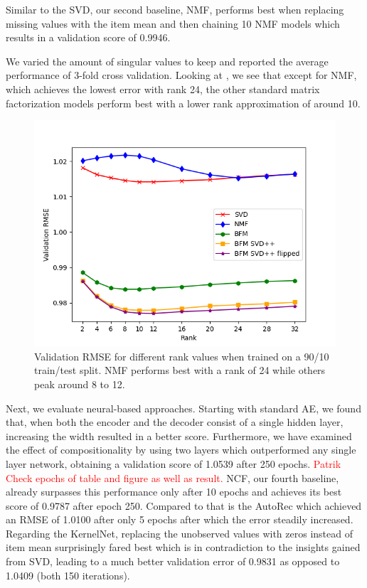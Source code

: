 \documentclass[10pt,conference,compsocconf]{IEEEtran}
\newcommand{\todo}[1]{\textcolor{red}{#1}}
\begin{document}


    Similar to the SVD, our second baseline, NMF, performs best when replacing missing values with the item mean and then chaining 10 NMF models which results in a validation score of 0.9946.

    We varied the amount of singular values to keep and reported the average performance of 3-fold cross validation.
    Looking at , we see that except for NMF, which achieves the lowest error with rank 24, the other standard matrix factorization models perform best with a lower rank approximation of around 10.
    \begin{figure}
        \includegraphics[width=\columnwidth]{figures/rank.png}
        \caption{Validation RMSE for different rank values when trained on a 90/10 train/test split.
        NMF performs best with a rank of 24 while others peak around 8 to 12.}
        \label{fig:rank}
    \end{figure}

    Next, we evaluate neural-based approaches.
    Starting with standard AE, we found that, when both the encoder and the decoder consist of a single hidden layer, increasing the width resulted in a better score.
    Furthermore, we have examined the effect of compositionality by using two layers which outperformed any single layer network, obtaining a validation score of 1.0539 after 250 epochs.
    \todo{Patrik Check epochs of table and figure as well as result.}
    NCF, our fourth baseline, already surpasses this performance only after 10 epochs and achieves its best score of 0.9787 after epoch 250.
    Compared to that is the AutoRec which achieved an RMSE of 1.0100 after only 5 epochs after which the error steadily increased.
    Regarding the KernelNet, replacing the unobserved values with zeros instead of item mean surprisingly fared best which is in contradiction to the insights gained from SVD, leading to a much better validation error of 0.9831 as opposed to 1.0409 (both 150 iterations).
\end{document}
